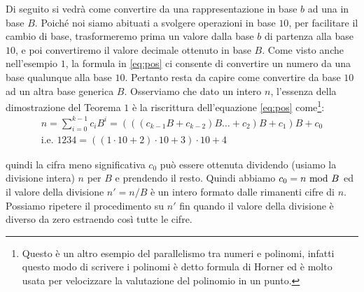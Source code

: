 Di seguito si vedrà come convertire da una rappresentazione in base $b$ ad una
in base $B$. Poiché noi siamo abituati a svolgere operazioni in base $10$, per
facilitare il cambio di base, trasformeremo prima un valore dalla base $b$ di
partenza alla base $10$, e poi convertiremo il valore decimale ottenuto in base
$B$. Come visto anche nell'esempio $1$, la formula in \eqref{eq:pos} ci
consente di convertire un numero da una base qualunque alla base $10$. Pertanto
resta da capire come convertire da base $10$ ad un altra base generica $B$.
Osserviamo che dato un intero $n$, l'essenza della dimostrazione del Teorema
$1$ è la riscrittura dell'equazione \eqref{eq:pos} come\footnote{Questo è un
altro esempio del parallelismo tra numeri e polinomi, infatti questo modo di
scrivere i polinomi è detto formula di Horner ed è molto usata per velocizzare
la valutazione del polinomio in un punto.}:
\begin{align*}
n = \sum_{i=0}^{k-1} c_iB^i = (((c_{k-1}B+c_{k-2})B\ldots+ c_2)B + c_1)B + c_0\\
\text{i.e. } 1234 = ((1\cdot{10}+2)\cdot{10}+3)\cdot{10} + 4
\end{align*}

\noindent quindi la cifra meno significativa $c_0$ può essere ottenuta
dividendo (usiamo la divisione intera) $n$ per $B$ e prendendo il resto.
 Quindi abbiamo $c_0 = n \ \text{mod}\ B$ ed il valore della divisione $n' = n /
B$ è un intero formato dalle rimanenti cifre di $n$. Possiamo ripetere il
procedimento su $n'$ fin quando il valore della divisione è diverso da zero estraendo così tutte le cifre.


